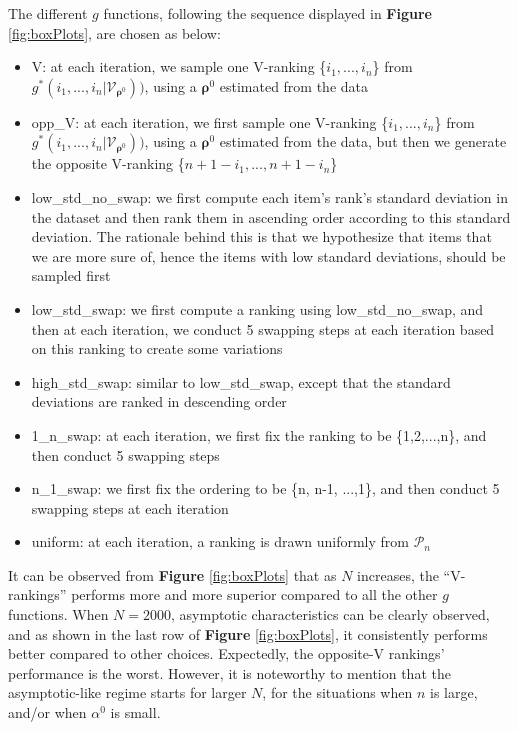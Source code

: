 \documentclass[11pt, oneside]{article}   	%
\begin{document}
The different $g$ functions, following the sequence displayed in \textbf{Figure} \ref{fig:boxPlots}, are chosen as below:
\begin{itemize}
	\item {V: at each iteration, we sample one V-ranking \{$i_1, ...,i_n$\} from $g^*(i_1, ..., i_n | \mathcal{V}_{\bm{\rho}^0}))$, using a $\bm{\rho}^0$ estimated from the data}
	\item {opp\_V: at each iteration, we first sample one V-ranking \{$i_1, ...,i_n$\} from $g^*(i_1, ..., i_n | \mathcal{V}_{\bm{\rho}^0}))$, using a $\bm{\rho}^0$ estimated from the data, but then we generate the opposite V-ranking \{$n+1 - i_1, ..., n+1 - i_n$\}}
	\item{low\_std\_no\_swap: we first compute each item's rank's standard deviation in the dataset and then rank them in ascending order according to this standard deviation. The rationale behind this is that we hypothesize that items that we are more sure of, hence the items with low standard deviations, should be sampled first}
	\item {low\_std\_swap:  we first compute a ranking using low\_std\_no\_swap, and then at each iteration, we conduct 5 swapping steps at each iteration based on this ranking to create some variations }
	\item {high\_std\_swap: similar to low\_std\_swap, except that the standard deviations are ranked in descending order}
	
	\item {1\_n\_swap: at each iteration, we first fix the ranking to be \{1,2,...,n\}, and then conduct 5 swapping steps}
	\item {n\_1\_swap: we first fix the ordering to be \{n, n-1, ...,1\}, and then conduct 5 swapping steps at each iteration}
	\item{uniform: at each iteration, a ranking is drawn uniformly from $\mathcal{P}_n$}
\end{itemize}

It can be observed from \textbf{Figure} \ref{fig:boxPlots} that as $N$ increases, the ``V-rankings'' performs more and more superior compared to all the other $g$ functions. When $N = 2000$, asymptotic characteristics can be clearly observed, and as shown in the last row of \textbf{Figure} \ref{fig:boxPlots}, it consistently performs better compared to other choices. Expectedly, the opposite-V rankings' performance is the worst. However, it is noteworthy to mention that the asymptotic-like  regime starts for larger $N$, for the situations when $n$ is large, and/or when $\alpha^0$ is small.%
\end{document}
